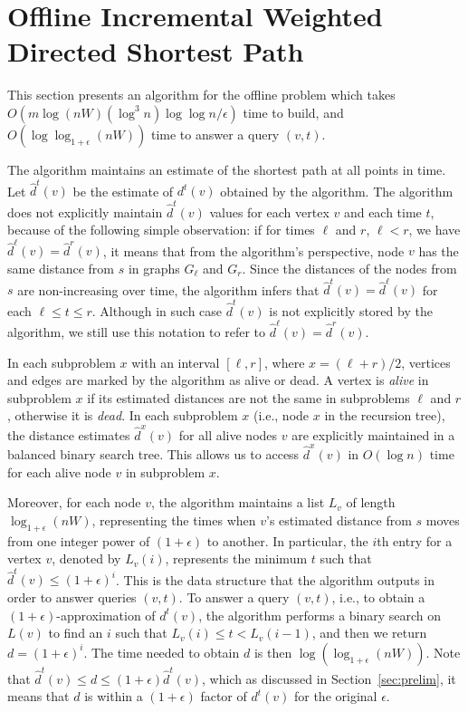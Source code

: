 \section{Offline Incremental Weighted Directed Shortest Path}
\label{sec:offline}
This section presents an algorithm for the offline problem which takes ${O(m\log (nW) (\log^3 n)\log\log n/\epsilon)}$ time to build, and $O(\log \log_{1+\epsilon}(nW))$ time to answer a query $(v,t)$.  

The algorithm maintains an estimate of the shortest path at all points in time.  
Let $\hat{d}^t(v)$ be the estimate of $d^t(v)$ obtained by the algorithm. 
The algorithm does not explicitly maintain $\hat{d}^t(v)$ values for each vertex $v$ and each time $t$, because of the following simple observation: 
if for times $\ell$ and $r$, $\ell<r$, we have $\hat{d}^\ell(v)=\hat{d}^r(v)$, it means that from the algorithm's perspective, node $v$ has the same distance from $s$ in graphs $G_{\ell}$ and $G_r$. 
Since the distances of the nodes from $s$
are non-increasing over time, the algorithm infers that $\hat{d}^t(v)=\hat{d}^\ell(v)$ for each $\ell \leq t \leq r$.
Although in such case $\hat{d}^t(v)$ is not explicitly stored by the algorithm, we still use this notation to refer to $\hat{d}^{\ell}(v)=\hat{d}^r(v)$.

In each subproblem $x$ with an interval $[\ell,r]$, where $x=(\ell+r)/2$, vertices and edges are marked by the algorithm as alive or dead.
A vertex is \emph{alive} in subproblem $x$ if its estimated distances are not the same in subproblems $\ell$ and $r$, otherwise it is \emph{dead}.
In each subproblem $x$ (i.e., node $x$ in the recursion tree), the distance estimates $\hat{d}^x(v)$ for all alive nodes $v$ are explicitly maintained in a balanced binary search tree.
This allows us to access $\hat{d}^x(v)$ in $O(\log n)$ time for each alive node $v$ in subproblem $x$.

Moreover, for each node $v$, the algorithm maintains a list $L_v$ of length
$\log_{1 + \epsilon}( nW)$, representing the times when $v$'s estimated distance from $s$ moves from one integer power of $(1+\epsilon)$ to another.
In particular, the $i$th entry for a vertex $v$, denoted by $L_v(i)$, represents the minimum $t$ such that $\hat{d}^t(v) \leq (1 + \epsilon)^i$.
This is the data structure that the algorithm outputs in order to answer queries $(v,t)$.
To answer a query $(v,t)$, i.e., to obtain a $(1+\epsilon)$-approximation of $d^t(v)$, the algorithm performs  a binary search on $L(v)$ to find an $i$ such that $L_v(i) \leq t < L_v(i-1)$, and then we return $d=(1+\epsilon)^i$.
The time needed to obtain $d$ is then $\log (\log_{1+\epsilon}(nW))$. 
Note that $\hat{d}^t(v) \leq d \leq (1+\epsilon)\hat{d}^t(v)$, which as discussed in Section~\ref{sec:prelim}, it means that $d$ is within a $(1+\epsilon)$ factor of $d^t(v)$ for the original $\epsilon$.

